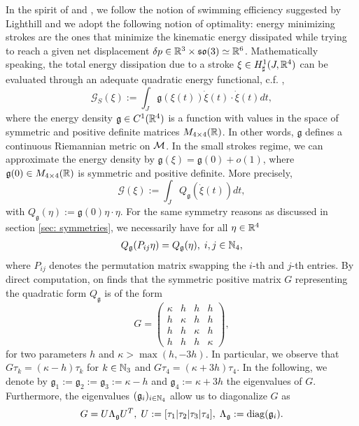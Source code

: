 In the spirit of \cite{Alouges2013} and \cite{Alouges2017}, we follow the notion of swimming efficiency suggested by Lighthill \cite{Lighthill1952} and we adopt the following notion of optimality: energy minimizing strokes are the ones that minimize the kinematic energy dissipated while trying to reach a given net displacement $\delta p \in \mathbb{R}^3 \times \mathfrak{so}(3) \simeq \mathbb{R}^6$. Mathematically speaking, the total energy dissipation due to a stroke $\xi \in H^1_{\sharp}(J, \mathbb{R}^4)$ can be evaluated through an adequate quadratic energy functional, c.f. \cite{Alouges2013},
\begin{equation}
 \mathcal{G}_S(\xi) := \int_{J} \mathfrak{g}(\xi(t))\dot{\xi}(t) \cdot \dot{\xi}(t) dt,
\end{equation}
where the energy density $\mathfrak{g} \in C^1(\mathbb{R}^4)$ is a function with values in the space of symmetric and positive definite matrices $M_{4 \times 4}(\mathbb{R})$. In other words, $\mathfrak{g}$ defines a continuous Riemannian metric on $\mathcal{M}$. In the small strokes regime, we can approximate the energy density by $\mathfrak{g}(\xi) = \mathfrak{g}(0) + o(1)$, where $\mathfrak{g}(0) \in M_{4 \times 4}(\mathbb{R})$ is symmetric and positive definite. More precisely,
\begin{equation}
\label{eq: linearized energy functional}
	\mathcal{G}(\xi) := \int_{J} Q_{\mathfrak{g}}(\dot{\xi}(t)) dt,
\end{equation}
with $Q_{\mathfrak{g}}(\eta) := \mathfrak{g}(0)\eta \cdot \eta$. For the same symmetry reasons as discussed in section \ref{sec: symmetries}, we necessarily have for all $\eta \in \mathbb{R}^4$
\begin{align}
	Q_{\mathfrak{g}}(P_{ij} \eta) = Q_{\mathfrak{g}}(\eta),\; i,j \in \mathbb{N}_4,
\end{align}
where $P_{ij}$ denotes the permutation matrix swapping the $i$-th and $j$-th entries. By direct computation, on finds that the symmetric positive matrix $G$ representing the quadratic form $Q_{\mathfrak{g}}$ is of the form
\begin{equation}
G = \left ( \begin{array}{cccc}
\kappa & h & h & h \\ 
h & \kappa & h & h \\ 
h & h & \kappa & h \\ 
h & h & h & \kappa
\end{array} \right ),
\end{equation}
for two parameters $h$ and $\kappa > \max(h, -3h)$. In particular, we observe that $G \tau_k = (\kappa - h ) \tau_k$ for $k \in  \mathbb{N}_3$ and $G \tau_4 = (\kappa + 3h) \tau_4$. In the following, we denote by $\mathfrak{g}_1 := \mathfrak{g}_2 := \mathfrak{g}_3 := \kappa - h$ and $\mathfrak{g}_4 := \kappa + 3h$ the eigenvalues of $G$. Furthermore, the eigenvalues $(\mathfrak{g}_i)_{i \in \mathbb{N}_4}$ allow us to diagonalize  $G$ as
\begin{align}
G = U \Lambda_{\mathfrak{g}} U^T, \; U := [\tau_1 | \tau_2 |\tau_3 |\tau_4], \; \Lambda_{\mathfrak{g}} := \operatorname{diag}(\mathfrak{g}_i).
\end{align}

